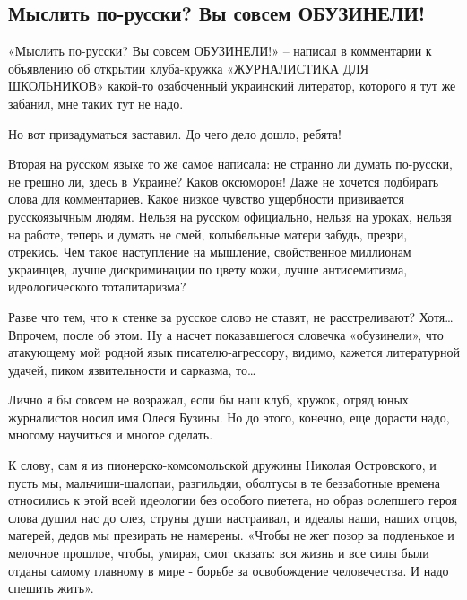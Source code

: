  
 
 

\subsection{Мыслить по-русски? Вы совсем ОБУЗИНЕЛИ!}
\label{sec:29_10_2020.fb.roman_barashev.1.sovsem_obuzineli}

«Мыслить по-русски? Вы совсем ОБУЗИНЕЛИ!» -- написал в комментарии к объявлению
об открытии клуба-кружка «ЖУРНАЛИСТИКА ДЛЯ ШКОЛЬНИКОВ» какой-то озабоченный
украинский литератор, которого я тут же забанил, мне таких тут не надо.

Но вот призадуматься заставил. До чего дело дошло, ребята!

Вторая на русском языке то же самое написала: не странно ли думать по-русски,
не грешно ли, здесь в Украине? Каков оксюморон! Даже не хочется подбирать слова
для комментариев. Какое низкое чувство ущербности прививается русскоязычным
людям. Нельзя на русском официально, нельзя на уроках, нельзя на работе, теперь
и думать не смей, колыбельные матери забудь, презри, отрекись. Чем такое
наступление на мышление, свойственное миллионам украинцев, лучше дискриминации
по цвету кожи, лучше антисемитизма, идеологического тоталитаризма?

Разве что тем, что к стенке за русское слово не ставят, не расстреливают? Хотя…
Впрочем, после об этом.  Ну а насчет показавшегося словечка «обузинели», что
атакующему мой родной язык писателю-агрессору, видимо, кажется литературной
удачей, пиком язвительности и сарказма, то…

Лично я бы совсем не возражал, если бы наш клуб, кружок, отряд юных журналистов
носил имя Олеся Бузины. Но до этого, конечно, еще дорасти надо, многому
научиться и многое сделать.

К слову, сам я из пионерско-комсомольской дружины Николая Островского, и пусть
мы, мальчиши-шалопаи, разгильдяи, оболтусы в те беззаботные времена относились
к этой всей идеологии без особого пиетета, но образ ослепшего героя слова душил
нас до слез, струны души настраивал, и идеалы наши, наших отцов, матерей, дедов
мы презирать не намерены. «Чтобы не жег позор за подленькое и мелочное прошлое,
чтобы, умирая, смог сказать: вся жизнь и все силы были отданы самому главному в
мире - борьбе за освобождение человечества. И надо спешить жить».

